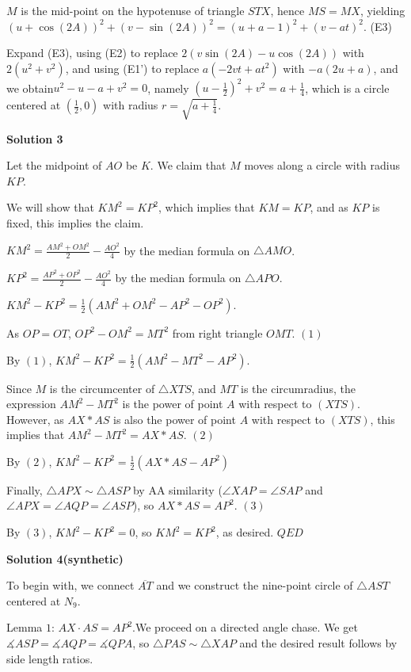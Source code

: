 \begin{enumerate}
 $M$ is the mid-point on the hypotenuse of triangle $STX$, hence $MS=MX$, yielding $(u+\cos(2A))^2+(v-\sin(2A))^2=(u+a-1)^2+(v-at)^2$.   (E3)

 Expand (E3), using (E2) to replace $2(v\sin(2A)-u\cos(2A))$ with $2(u^2+v^2)$, and using (E1') to replace $a(-2vt+at^2)$ with $-a(2u+a)$, and we obtain$u^2-u-a+v^2=0$, namely $(u-\frac{1}{2})^2+v^2=a+\frac{1}{4}$, which is a circle centered at $(\frac{1}{2},0)$ with radius $r=\sqrt{a+\frac{1}{4}}$.

 


 



\textbf{Solution 3}

Let the midpoint of $AO$ be $K$. We claim that $M$ moves along a circle with radius $KP$.

 We will show that $KM^2 = KP^2$, which implies that $KM = KP$, and as $KP$ is fixed, this implies the claim.

 $KM^2 = \frac{AM^2+OM^2}{2}-\frac{AO^2}{4}$ by the median formula on $\triangle AMO$.

 $KP^2 = \frac{AP^2+OP^2}{2}-\frac{AO^2}{4}$ by the median formula on $\triangle APO$.

 $KM^2-KP^2 = \frac{1}{2}(AM^2+OM^2-AP^2-OP^2)$.

 As $OP = OT$, $OP^2-OM^2 = MT^2$ from right triangle $OMT$. $(1)$

 By $(1)$, $KM^2-KP^2 = \frac{1}{2}(AM^2-MT^2-AP^2)$.

 Since $M$ is the circumcenter of $\triangle XTS$, and $MT$ is the circumradius, the expression $AM^2-MT^2$ is the power of point $A$ with respect to $(XTS)$. However, as $AX*AS$ is also the power of point $A$ with respect to $(XTS)$, this implies that $AM^2-MT^2=AX*AS$. $(2)$

 By $(2)$, $KM^2-KP^2 = \frac{1}{2}(AX*AS-AP^2)$

 Finally, $\triangle APX \sim \triangle ASP$ by AA similarity ($\angle XAP = \angle SAP$ and $\angle APX = \angle AQP = \angle ASP$), so $AX*AS = AP^2$. $(3)$

 By $(3)$, $KM^2-KP^2=0$, so $KM^2=KP^2$, as desired. $QED$




\textbf{Solution 4(synthetic)}

To begin with, we connect $\overline{AT}$ and we construct the nine-point circle of $\triangle AST$ centered at $N_9$.

 Lemma $1$: $AX \cdot AS = AP^2$.We proceed on a directed angle chase. We get $\measuredangle ASP = \measuredangle AQP = \measuredangle QPA$, so $\triangle PAS \sim \triangle XAP$ and the desired result follows by side length ratios.


\end{enumerate}
